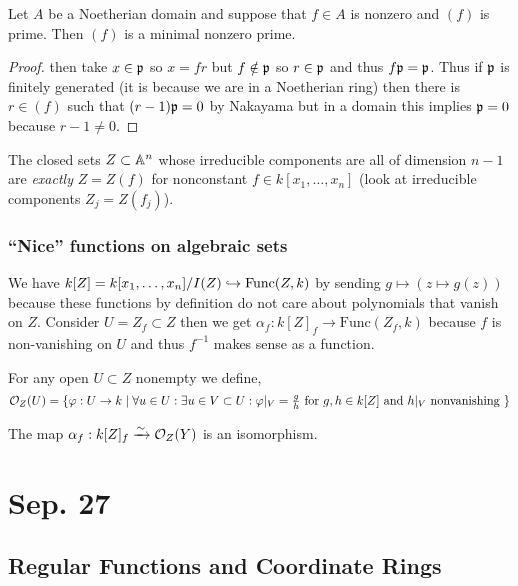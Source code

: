 \documentclass[12pt]{article}
\begin{document}
\begin{prop}
Let $A$ be a Noetherian domain and suppose that $f \in A$ is nonzero and $(f)$ is prime. Then $(f)$ is a minimal nonzero prime.
\end{prop}

\begin{proof}
 then take $x \in \mathfrak{p}$ so $x = fr$ but $f \notin \mathfrak{p}$ so $r \in \mathfrak{p}$ and thus $f \mathfrak{p} = \mathfrak{p}$. Thus if $\mathfrak{p}$ is finitely generated (it is because we are in a Noetherian ring) then there is $r \in (f)$ such that $(r - 1) \mathfrak{p} = 0$ by Nakayama but in a domain this implies $\mathfrak{p} = 0$ because $r - 1 \neq 0$.
\end{proof}

\begin{rmk}
The closed sets $Z \subset \mathbb{A}^n$ whose irreducible components are all of dimension $n - 1$ are \textit{exactly} $Z = Z(f)$ for nonconstant $f \in k[x_1, \dots, x_n]$ (look at irreducible components $Z_j = Z(f_j)$).
\end{rmk}

\subsubsection{``Nice'' functions on algebraic sets}

We have $k[Z] = k[x_1, \dots, x_n] / I(Z) \hookrightarrow \mathrm{Func}(Z, k)$ by sending $g \mapsto (z \mapsto g(z))$ because these functions by definition do not care about polynomials that vanish on $Z$. Consider $U = Z_f \subset Z$ then we get $\alpha_f : k[Z]_f \to \mathrm{Func}(Z_f, k)$ because $f$ is non-vanishing on $U$ and thus $f^{-1}$ makes sense as a function. 

\begin{defn}
For any open $U \subset Z$ nonempty we define,
\[ \mathcal{O}_{Z}(U) = \{ \varphi : U \to k \mid \forall u \in U : \exists u \in V \subset U : \varphi|_V = \tfrac{g}{h} \text{ for } g,h \in k[Z] \text{ and } h|_V \text{ nonvanishing } \} \]
\end{defn}

\begin{prop}
The map $\alpha_f : k[Z]_f \xrightarrow{\sim} \mathcal{O}_{Z}(Y)$ is an isomorphism.
\end{prop}

\section{Sep. 27}

\subsection{Regular Functions and Coordinate Rings}
\end{document}
